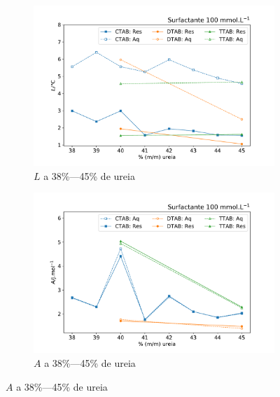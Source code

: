 		\begin{figure}[H]
			\centering
			\begin{subfigure}[t]{0.60\textwidth}
				\includegraphics[width=\textwidth]{./imagens/dsc/L_100mM_aq_res}
				\caption{$L$ a 38\%---45\% de ureia}
				\label{fig:DSC_L_38_45pUr}
			\end{subfigure}
			
			\begin{subfigure}[t]{0.60\textwidth}
				\includegraphics[width=\textwidth]{./imagens/dsc/A_100mM_aq_res}
				\caption{$A$ a 38\%---45\% de ureia}
				\label{fig:DSC_A_38_45pUr}
			\end{subfigure} 
			

\end{figure}
